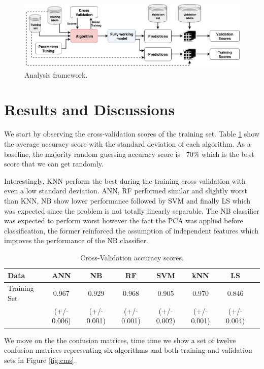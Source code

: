 \documentclass{article}
\begin{document}
\begin{figure}
\center
  \includegraphics[width=0.9\linewidth]{img/framework}
  \caption{Analysis framework.}
  \label{fig:framework}
\end{figure}


\section{Results and Discussions}
We start by observing the cross-validation scores of the training set. Table \ref{tab:cv} show the average accuracy score with the standard deviation of each algorithm. As a baseline, the majority random guessing accuracy score is ~70\% which is the best score that we can get randomly.

Interestingly, KNN perform the best during the training cross-validation with even a low standard deviation. ANN, RF performed similar and slightly worst than KNN, NB show lower performance followed by SVM and finally LS which was expected since the problem is not totally linearly separable. The NB classifier was expected to perform worst however the fact the PCA was applied before classification, the former reinforced the assumption of independent features which improves the performance of the NB classifier.

\begin{table}
\center

\begin{tabular}{l*{6}{c}r}
Data           & ANN & NB & RF & SVM & kNN & LS \\
\hline
Training Set          & 0.967  & 0.929   & 0.968  & 0.905  & 0.970  & 0.846  \\
& (+/- 0.006) & (+/- 0.001) & (+/- 0.001) & (+/- 0.002) & (+/- 0.001) & (+/- 0.004) \\

\end{tabular}
\caption{Cross-Validation accuracy scores.}
\label{tab:cv}
\end{table}

We move on the the confusion matrices, time time we show a set of twelve confusion matrices representing six algorithms and both training and validation sets in Figure \ref{fig:cms}.
\end{document}

